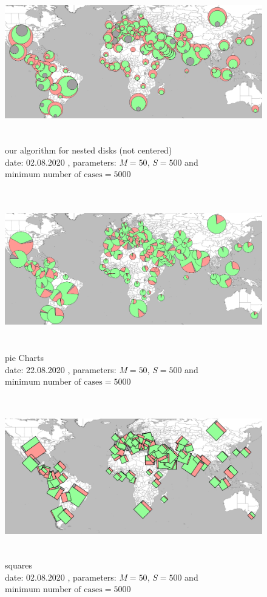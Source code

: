 \documentclass[a4paper,11pt]{article}
\begin{document}
\begin{figure}[h]
  \centering
  \includegraphics[height=7cm]{assets/HawaiianEval}
  \caption{our algorithm for nested disks (not centered)\\
  date: 02.08.2020  , parameters: $M=50$, $S=500$ and $\text{minimum number of cases}=5000$  }
\end{figure}

\begin{figure}[h]
  \centering
  \includegraphics[height=7cm]{assets/pieChartsEval}
  \caption{pie Charts\\
  date: 22.08.2020  , parameters: $M=50$, $S=500$ and $\text{minimum number of cases}=5000$  }
\end{figure}

\begin{figure}[h]
  \centering
  \includegraphics[height=7cm]{assets/squaresEval}
  \caption{squares\\
  date: 02.08.2020  , parameters: $M=50$, $S=500$ and $\text{minimum number of cases}=5000$  }
\end{figure}
\end{document}
